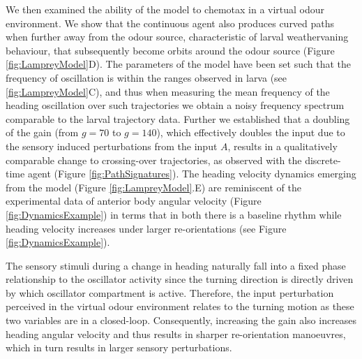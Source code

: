 \documentclass[11pt,a4paper]{article}
\newcommand{\todoBW}[1]{\todo[author=BW,color=orange, size=\tiny,inline]{#1}}
\newcommand{\todoML}[1]{\todo[author=ML,color=white, size=\tiny,inline]{#1}}
\begin{document}
We then examined the ability of the model to chemotax in a virtual odour environment. We show that the continuous agent also produces curved paths when further away from the odour source, characteristic of larval weathervaning behaviour, that subsequently become orbits around the odour source (Figure \ref{fig:LampreyModel}D). The parameters of the model have been set such that the frequency of oscillation is within the ranges observed in larva (see \ref{fig:LampreyModel}C), and thus when measuring the mean frequency of the heading oscillation over such trajectories we obtain a noisy frequency spectrum comparable to the larval trajectory data. 
Further we established that a doubling of the gain (from $g=70$ to $g=140$), which effectively doubles the input due to the sensory induced perturbations from the input $A$, results in a qualitatively comparable change to crossing-over trajectories, as observed with the discrete-time agent (Figure \ref{fig:PathSignatures}).
 The heading velocity dynamics emerging from the model (Figure \ref{fig:LampreyModel}.E) are reminiscent of the experimental data of anterior body angular velocity (Figure \ref{fig:DynamicsExample}) in terms that in both there is a baseline rhythm while heading velocity increases under larger re-orientations (see Figure \ref{fig:DynamicsExample}).

 
The sensory stimuli during a change in heading naturally fall into a fixed phase relationship to the oscillator activity since the turning direction is directly driven by which oscillator compartment is active. Therefore, the input perturbation perceived in the virtual odour environment relates to the turning motion as these two variables are in a closed-loop. 
Consequently, increasing the gain also increases heading angular velocity and thus results in sharper re-orientation manoeuvres, which in turn results in larger sensory perturbations.
 
\end{document}
